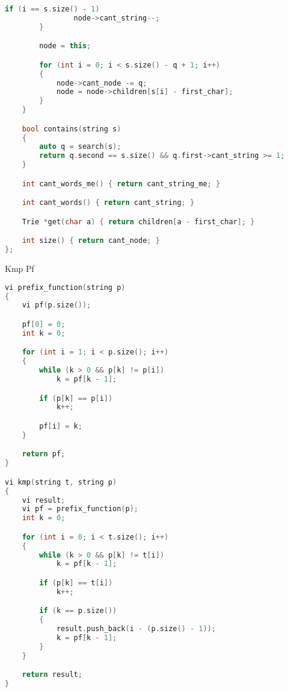 \documentclass[leter]{amsart}
\begin{document}
\begin{multicols}{2}
\begin{lstlisting}[language=C++]
            if (i == s.size() - 1)
                node->cant_string--;
        }

        node = this;

        for (int i = 0; i < s.size() - q + 1; i++)
        {
            node->cant_node -= q;
            node = node->children[s[i] - first_char];
        }
    }

    bool contains(string s)
    {
        auto q = search(s);
        return q.second == s.size() && q.first->cant_string >= 1;
    }

    int cant_words_me() { return cant_string_me; }

    int cant_words() { return cant_string; }

    Trie *get(char a) { return children[a - first_char]; }

    int size() { return cant_node; }
};

\end{lstlisting}
\end{multicols}
Kmp Pf
\begin{multicols}{2}
\begin{lstlisting}[language=C++]
vi prefix_function(string p)
{
    vi pf(p.size());

    pf[0] = 0;
    int k = 0;

    for (int i = 1; i < p.size(); i++)
    {
        while (k > 0 && p[k] != p[i])
            k = pf[k - 1];

        if (p[k] == p[i])
            k++;

        pf[i] = k;
    }

    return pf;
}

vi kmp(string t, string p)
{
    vi result;
    vi pf = prefix_function(p);
    int k = 0;

    for (int i = 0; i < t.size(); i++)
    {
        while (k > 0 && p[k] != t[i])
            k = pf[k - 1];

        if (p[k] == t[i])
            k++;

        if (k == p.size())
        {
            result.push_back(i - (p.size() - 1));
            k = pf[k - 1];
        }
    }

    return result;
}

\end{lstlisting}
\end{multicols}
\end{document}
